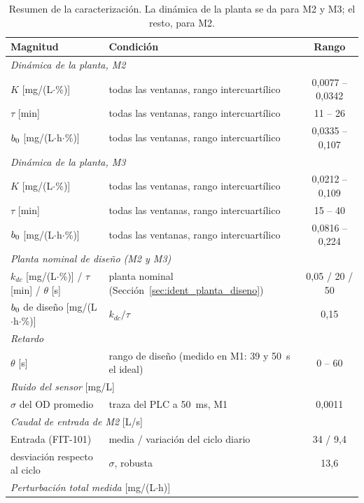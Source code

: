\begin{table}[!htbp]
\centering
\caption{Resumen de la caracterización. La dinámica de la planta se da para
M2 y M3; el resto, para M2.}
\label{tab:ident_resumen}
\footnotesize
\renewcommand{\arraystretch}{1.0}
\begin{tabular}{llc}
\toprule
\textbf{Magnitud} & \textbf{Condición} & \textbf{Rango} \\
\midrule
\multicolumn{3}{l}{\emph{Dinámica de la planta, M2}} \\
$K$ [mg/(L$\cdot$\%)] & todas las ventanas, rango intercuartílico & 0,0077 -- 0,0342 \\
$\tau$ [min] & todas las ventanas, rango intercuartílico & 11 -- 26 \\
$b_{0}$ [mg/(L$\cdot$h$\cdot$\%)] & todas las ventanas, rango intercuartílico & 0,0335 -- 0,107 \\
\midrule
\multicolumn{3}{l}{\emph{Dinámica de la planta, M3}} \\
$K$ [mg/(L$\cdot$\%)] & todas las ventanas, rango intercuartílico & 0,0212 -- 0,109 \\
$\tau$ [min] & todas las ventanas, rango intercuartílico & 15 -- 40 \\
$b_{0}$ [mg/(L$\cdot$h$\cdot$\%)] & todas las ventanas, rango intercuartílico & 0,0816 -- 0,224 \\
\midrule
\multicolumn{3}{l}{\emph{Planta nominal de diseño (M2 y M3)}} \\
$k_{dc}$ [mg/(L$\cdot$\%)] / $\tau$ [min] / $\theta$ [s] & planta nominal (Sección~\ref{sec:ident_planta_diseno}) & 0,05 / 20 / 50 \\
$b_{0}$ de diseño [mg/(L$\cdot$h$\cdot$\%)] & $k_{dc}/\tau$ & 0,15 \\
\midrule
\multicolumn{3}{l}{\emph{Retardo}} \\
$\theta$ [s] & rango de diseño (medido en M1: 39 y 50~s el ideal) & 0 -- 60 \\
\midrule
\multicolumn{3}{l}{\emph{Ruido del sensor} [mg/L]} \\
$\sigma$ del OD promedio & traza del PLC a 50~ms, M1 & 0,0011 \\
\midrule
\multicolumn{3}{l}{\emph{Caudal de entrada de M2} [L/s]} \\
Entrada (FIT-101) & media / variación del ciclo diario & 34 / 9,4 \\
\quad desviación respecto al ciclo & $\sigma$, robusta & 13,6 \\
\midrule
\multicolumn{3}{l}{\emph{Perturbación total medida} [mg/(L$\cdot$h)]} \\

\end{tabular}
\end{table}
